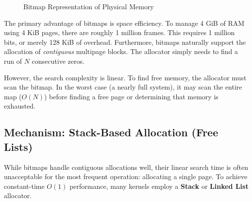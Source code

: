 \documentclass[a4paper,10pt,twoside]{report}
\theoremstyle{definition}
\begin{document}
\begin{figure}[htbp]
\centering
{}
\caption{Bitmap Representation of Physical Memory}
\label{fig:bitmap_allocator}
\end{figure}

The primary advantage of bitmaps is space efficiency. To manage 4 GiB of RAM using 4 KiB pages, there are roughly 1 million frames. This requires 1 million bits, or merely 128 KiB of overhead. Furthermore, bitmaps naturally support the allocation of \textit{contiguous} multipage blocks. The allocator simply needs to find a run of $N$ consecutive zeros.

However, the search complexity is linear. To find free memory, the allocator must scan the bitmap. In the worst case (a nearly full system), it may scan the entire map ($O(N)$) before finding a free page or determining that memory is exhausted.

\subsection{Mechanism: Stack-Based Allocation (Free Lists)}

While bitmaps handle contiguous allocations well, their linear search time is often unacceptable for the most frequent operation: allocating a single page. To achieve constant-time $O(1)$ performance, many kernels employ a \textbf{Stack} or \textbf{Linked List} allocator.
\end{document}
